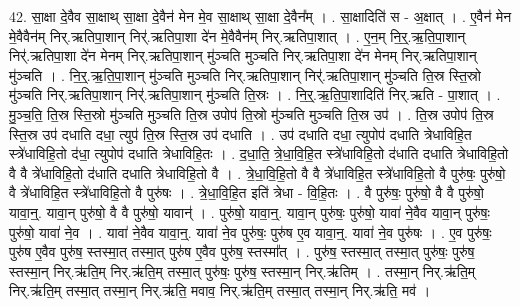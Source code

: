 \documentclass[17pt]{extarticle}
\begin{document}
42. सा॒क्षा दे॒वैव सा॒क्षाथ् सा॒क्षा दे॒वैन॑ मेन मे॒व सा॒क्षाथ् सा॒क्षा दे॒वैन᳚म् । . सा॒क्षादिति॑ स - अ॒क्षात् । . ए॒वैन॑ मेन मे॒वैवैन॑म् निर्.ऋतिपा॒शान् निर्॑.ऋतिपा॒शा दे॑न मे॒वैवैन॑म् निर्.ऋतिपा॒शात् । . ए॒न॒म् नि॒र्॒.ऋ॒ति॒पा॒शान् निर्॑.ऋतिपा॒शा दे॑न मेनम् निर्.ऋतिपा॒शान् मु॑ञ्चति मुञ्चति निर्.ऋतिपा॒शा दे॑न मेनम् निर्.ऋतिपा॒शान् मु॑ञ्चति । . नि॒र्॒.ऋ॒ति॒पा॒शान् मु॑ञ्चति मुञ्चति निर्.ऋतिपा॒शान् निर्॑.ऋतिपा॒शान् मु॑ञ्चति ति॒स्र स्ति॒स्रो मु॑ञ्चति निर्.ऋतिपा॒शान् निर्॑.ऋतिपा॒शान् मु॑ञ्चति ति॒स्रः । . नि॒र्॒.ऋ॒ति॒पा॒शादिति॑ निर्.ऋति - पा॒शात् । . मु॒ञ्च॒ति॒ ति॒स्र स्ति॒स्रो मु॑ञ्चति मुञ्चति ति॒स्र उपोप॑ ति॒स्रो मु॑ञ्चति मुञ्चति ति॒स्र उप॑ । . ति॒स्र उपोप॑ ति॒स्र स्ति॒स्र उप॑ दधाति दधा॒ त्युप॑ ति॒स्र स्ति॒स्र उप॑ दधाति । . उप॑ दधाति दधा॒ त्युपोप॑ दधाति त्रेधाविहि॒त स्त्रे॑धाविहि॒तो द॑धा॒ त्युपोप॑ दधाति त्रेधाविहि॒तः । . द॒धा॒ति॒ त्रे॒धा॒वि॒हि॒त स्त्रे॑धाविहि॒तो द॑धाति दधाति त्रेधाविहि॒तो वै वै त्रे॑धाविहि॒तो द॑धाति दधाति त्रेधाविहि॒तो वै । . त्रे॒धा॒वि॒हि॒तो वै वै त्रे॑धाविहि॒त स्त्रे॑धाविहि॒तो वै पुरु॑षः॒ पुरु॑षो॒ वै त्रे॑धाविहि॒त स्त्रे॑धाविहि॒तो वै पुरु॑षः । . त्रे॒धा॒वि॒हि॒त इति॑ त्रेधा - वि॒हि॒तः । . वै पुरु॑षः॒ पुरु॑षो॒ वै वै पुरु॑षो॒ यावा॒न्॒. यावा॒न् पुरु॑षो॒ वै वै पुरु॑षो॒ यावान्॑ । . पुरु॑षो॒ यावा॒न्॒. यावा॒न् पुरु॑षः॒ पुरु॑षो॒ यावा॑ ने॒वैव यावा॒न् पुरु॑षः॒ पुरु॑षो॒ यावा॑ ने॒व । . यावा॑ ने॒वैव यावा॒न्॒. यावा॑ ने॒व पुरु॑षः॒ पुरु॑ष ए॒व यावा॒न्॒. यावा॑ ने॒व पुरु॑षः । . ए॒व पुरु॑षः॒ पुरु॑ष ए॒वैव पुरु॑ष॒ स्तस्मा॒त् तस्मा॒त् पुरु॑ष ए॒वैव पुरु॑ष॒ स्तस्मा᳚त् । . पुरु॑ष॒ स्तस्मा॒त् तस्मा॒त् पुरु॑षः॒ पुरु॑ष॒ स्तस्मा॒न् निर्.ऋ॑ति॒म् निर्.ऋ॑ति॒म् तस्मा॒त् पुरु॑षः॒ पुरु॑ष॒ स्तस्मा॒न् निर्.ऋ॑तिम् । . तस्मा॒न् निर्.ऋ॑ति॒म् निर्.ऋ॑ति॒म् तस्मा॒त् तस्मा॒न् निर्.ऋ॑ति॒ मवाव॒ निर्.ऋ॑ति॒म् तस्मा॒त् तस्मा॒न् निर्.ऋ॑ति॒ मव॑ । \newline
\end{document}

